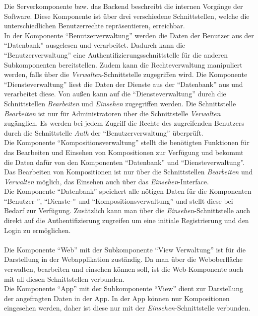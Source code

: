 \noindent
Die Serverkomponente bzw. das Backend beschreibt die internen Vorgänge der Software.
Diese Komponente ist über drei verschiedene Schnittstellen, welche die unterschiedlichen
Benutzerrechte repräsentieren, erreichbar.\\
In der Komponente ``Benutzerverwaltung'' werden die Daten der Benutzer aus der ``Datenbank'' ausgelesen und verarbeitet.
Dadurch kann die ``Benutzerverwaltung'' eine Authentifizierungsschnittstelle für die anderen Subkomponenten bereitstellen.
Zudem kann die Rechteverwaltung manipuliert werden, falls über die \textit{Verwalten}-Schnittstelle zugegriffen wird.
Die Komponente ``Diensteverwaltung'' liest die Daten der Dienste aus der ``Datenbank'' aus und verarbeitet diese.
Von außen kann auf die ``Diensteverwaltung'' durch die Schnittstellen \textit{Bearbeiten} und \textit{Einsehen} zugegriffen werden.
Die Schnittstelle \textit{Bearbeiten} ist nur für Administratoren über die Schnittstelle \textit{Verwalten} zugänglich.
Es werden bei jedem Zugriff die Rechte des zugreifenden Benutzers durch die Schnittstelle \textit{Auth} der ``Benutzerverwaltung'' überprüft.\\
Die Komponente ``Kompositionsverwaltung'' stellt die benötigten Funktionen für das Bearbeiten und Einsehen von Kompositionen zur Verfügung und bekommt die Daten dafür von den Komponenten ``Datenbank'' und ``Diensteverwaltung''.
Das Bearbeiten von Kompositionen ist nur über die Schnittstellen \textit{Bearbeiten} und \textit{Verwalten} möglich, das Einsehen auch über das \textit{Einsehen}-Interface.\\
Die Komponente ``Datenbank'' speichert alle nötigen Daten für die Komponenten ``Benutzer-'', ``Dienste-'' und ``Kompositionsverwaltung'' und stellt diese bei Bedarf zur Verfügung.
Zusätzlich kann man über die \textit{Einsehen}-Schnittstelle auch direkt auf die Authentifizierung zugreifen um eine initiale Registrierung und den Login zu ermöglichen.\\
\\
Die Komponente ``Web'' mit der Subkomponente ``View Verwaltung'' ist für die Darstellung in der Webapplikation zuständig.
Da man über die Weboberfläche verwalten, bearbeiten und einsehen können soll, ist die Web-Komponente auch mit all diesen Schnittstellen verbunden.\\
Die Komponente ``App'' mit der Subkomponente ``View'' dient zur Darstellung der angefragten Daten in der App.
In der App können nur Kompositionen eingesehen werden, daher ist diese nur mit der \textit{Einsehen}-Schnittstelle verbunden.
